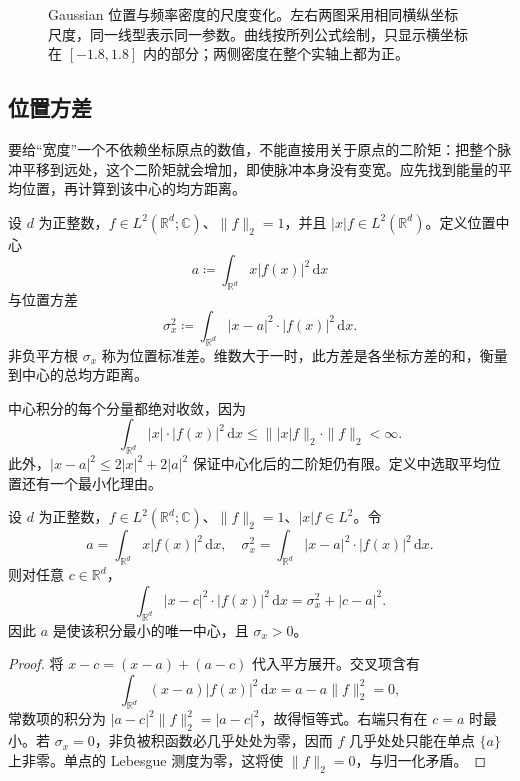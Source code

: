 \begin{figure}[htbp]
 \caption[Gaussian 位置与频率密度的尺度变化]{Gaussian 位置与频率密度的尺度变化。左右两图采用相同横纵坐标尺度，同一线型表示同一参数。曲线按所列公式绘制，只显示横坐标在 \([-1.8,1.8]\) 内的部分；两侧密度在整个实轴上都为正。}
 \label{b2:fig:20-gaussian-scaling}
\end{figure}

\subsection{位置方差}
\label{b2:subsec:200102}

要给“宽度”一个不依赖坐标原点的数值，不能直接用关于原点的二阶矩：把整个脉冲平移到远处，这个二阶矩就会增加，即使脉冲本身没有变宽。应先找到能量的平均位置，再计算到该中心的均方距离。

\begin{definition}[位置中心与方差]\label{b2:def:20-position-variance}
设 \(d\) 为正整数，\(f\in L^2(\mathbb R^d;\mathbb C)\)、\(\|f\|_2=1\)，并且 \(|x|f\in L^2(\mathbb R^d)\)。定义位置中心
\[
 a\coloneqq\int_{\mathbb R^d}x|f(x)|^2\,\mathrm dx
\]
与位置方差
\[
 \sigma_x^2\coloneqq
 \int_{\mathbb R^d}|x-a|^2\cdot|f(x)|^2\,\mathrm dx.
\]
非负平方根 \(\sigma_x\) 称为位置标准差。维数大于一时，此方差是各坐标方差的和，衡量到中心的总均方距离。
\end{definition}

中心积分的每个分量都绝对收敛，因为
\[
 \int_{\mathbb R^d}|x|\cdot|f(x)|^2\,\mathrm dx
 \leq\bigl\||x|f\bigr\|_2\cdot\|f\|_2<\infty.
\]
此外，\(|x-a|^2\leq2|x|^2+2|a|^2\) 保证中心化后的二阶矩仍有限。定义中选取平均位置还有一个最小化理由。

\begin{proposition}[中心使二阶矩最小]\label{b2:prop:20-variance-center}
设 \(d\) 为正整数，\(f\in L^2(\mathbb R^d;\mathbb C)\)、\(\|f\|_2=1\)、\(|x|f\in L^2\)。令
\[
 a=\int_{\mathbb R^d}x|f(x)|^2\,\mathrm dx,
 \quad
 \sigma_x^2=\int_{\mathbb R^d}|x-a|^2\cdot|f(x)|^2\,\mathrm dx.
\]
则对任意 \(c\in\mathbb R^d\)，
\[
 \int_{\mathbb R^d}|x-c|^2\cdot|f(x)|^2\,\mathrm dx
 =\sigma_x^2+|c-a|^2.
\]
因此 \(a\) 是使该积分最小的唯一中心，且 \(\sigma_x>0\)。
\end{proposition}
\begin{proof}
将 \(x-c=(x-a)+(a-c)\) 代入平方展开。交叉项含有
\[
 \int_{\mathbb R^d}(x-a)|f(x)|^2\,\mathrm dx
 =a-a\|f\|_2^2=0,
\]
常数项的积分为 \(|a-c|^2\|f\|_2^2=|a-c|^2\)，故得恒等式。右端只有在 \(c=a\) 时最小。若 \(\sigma_x=0\)，非负被积函数必几乎处处为零，因而 \(f\) 几乎处处只能在单点 \(\{a\}\) 上非零。单点的 Lebesgue 测度为零，这将使 \(\|f\|_2=0\)，与归一化矛盾。
\end{proof}

